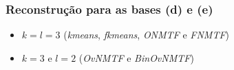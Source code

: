 \documentclass[10pt]{beamer}
\begin{document}
\begin{frame}
\frametitle{Reconstrução para as bases (d) e (e)}

  \begin{itemize}
      \item $k = l = 3$ (\textit{kmeans}, \textit{fkmeans}, \textit{ONMTF} e \textit{FNMTF})
      \item $k = 3$ e $l = 2$ (\textit{OvNMTF} e \textit{BinOvNMTF})
  \end{itemize}


\end{frame}
\end{document}
